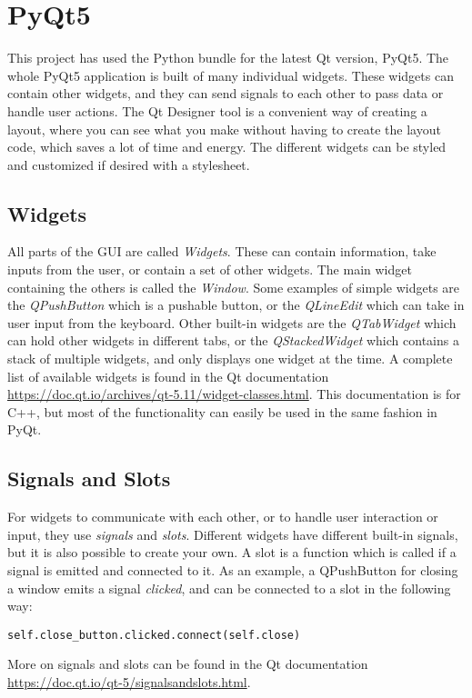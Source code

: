 \section{PyQt5}

This project has used the Python bundle for the latest Qt version, PyQt5. The whole PyQt5 application is built of many individual widgets. These widgets can contain other widgets, and they can send signals to each other to pass data or handle user actions. The Qt Designer tool is a convenient way of creating a layout, where you can see what you make without having to create the layout code, which saves a lot of time and energy. The different widgets can be styled and customized if desired with a stylesheet.

\subsection{Widgets}

All parts of the GUI are called \textit{Widgets}. These can contain information, take inputs from the user, or contain a set of other widgets. The main widget containing the others is called the \textit{Window}. Some examples of simple widgets are the \textit{QPushButton} which is a pushable button, or the \textit{QLineEdit} which can take in user input from the keyboard. Other built-in widgets are the \textit{QTabWidget} which can hold other widgets in different tabs, or the \textit{QStackedWidget} which contains a stack of multiple widgets, and only displays one widget at the time. A complete list of available widgets is found in the Qt documentation \url{https://doc.qt.io/archives/qt-5.11/widget-classes.html}. This documentation is for C++, but most of the functionality can easily be used in the same fashion in PyQt.

\subsection{Signals and Slots}

For widgets to communicate with each other, or to handle user interaction or input, they use \textit{signals} and \textit{slots}. Different widgets have different built-in signals, but it is also possible to create your own. A slot is a function which is called if a signal is emitted and connected to it. As an example, a QPushButton for closing a window emits a signal \textit{clicked}, and can be connected to a slot in the following way: \begin{verbatim}
self.close_button.clicked.connect(self.close)
\end{verbatim}
More on signals and slots can be found in the Qt documentation \url{https://doc.qt.io/qt-5/signalsandslots.html}.

